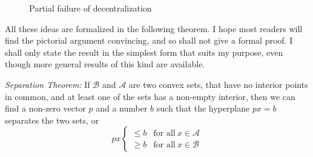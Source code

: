 \begin{figure}[!htp]
   \begin{minipage}{1.0\linewidth}
\centering
   \end{minipage} 
 \caption{Partial failure of decentralization} \label{Fig6.3} 
\end{figure}

All these ideas are formalized in the following theorem. I hope most readers will find the pictorial argument convincing, and so shall not give a formal proof. I shall only state the result in the simplest form that suits my purpose, even though more general results of this kind are available.

\textit{Separation Theorem:} If $\mathcal{B}$ and $\mathcal{A}$ are two convex sets, that have no interior points in common, and at least one of the sets has a non-empty interior, then we can find a non-zero vector $p$ and a number $b$ such that the hyperplane $px=b$ separates the two sets, or 
\begin{equation} \label{equa6.5}
 px  \left\{  \begin{array}{ll}  
\leq b &  \mbox{for all} \  x \in \mathcal{A} \\
\geq b &  \mbox{for all} \  x \in \mathcal{B}
\end{array}
  \right.
\end{equation}
 
